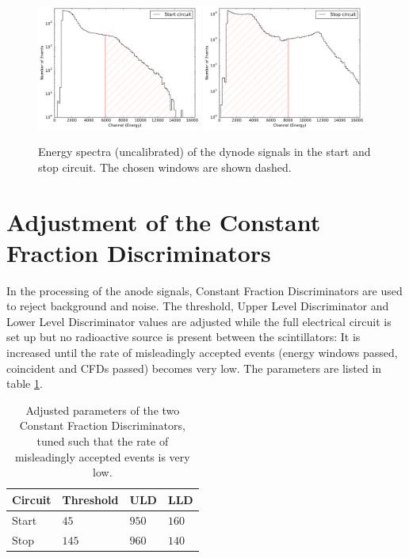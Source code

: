 \documentclass[
	paper=A4,
	parskip=full,
	chapterprefix=true,
	11pt,
	headings=normal,
	bibliography=totoc,
	listof=totoc,
	titlepage=on,
]{scrreprt}
\begin{document}
\begin{figure}[h]
	\centering
	\includegraphics[width=0.48\textwidth]{windows_0}
	\includegraphics[width=0.48\textwidth]{windows_1}
	\caption{Energy spectra (uncalibrated) of the dynode signals in the start and stop circuit. The chosen windows are shown dashed.}
	\label{fig:WD_spectra}
\end{figure}

\FloatBarrier
\section{Adjustment of the Constant Fraction Discriminators}
\label{ch_CFD}
In the processing of the anode signals, Constant Fraction Discriminators are used to reject background and noise. The threshold, Upper Level Discriminator and Lower Level Discriminator values are adjusted while the full electrical circuit is set up but no radioactive source is present between the scintillators: It is increased until the rate of misleadingly accepted events (energy windows passed, coincident and CFDs passed) becomes very low. The parameters are listed in table \ref{tbl:CFD_values}.

\begin{table}[htbp]
	\centering
	\begin{tabular}{ 
			l
			l
			l
			l
		}
		\toprule
		{Circuit} & {Threshold} & {ULD} & {LLD} \\ 
		\midrule
		Start & $45$ & $950$ & $160$ \\
		Stop & $145$ & $960$ & $140$ \\
		\bottomrule
	\end{tabular}
	\caption{Adjusted parameters of the two Constant Fraction Discriminators, tuned such that the rate of misleadingly accepted events is very low.}
	\label{tbl:CFD_values}
\end{table}
\end{document}
